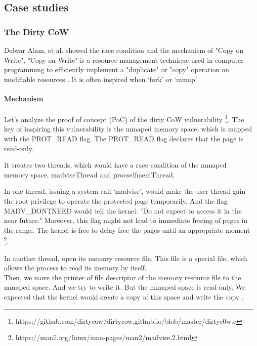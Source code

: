 \subsection{Case studies}
\label{k_case}

\subsubsection{The Dirty CoW}
Delwar Alam, et al. \cite{8019988} showed the race condition and the mechanism of "Copy on
Write". "Copy on Write" is a resource-management technique used in computer programming
to efficiently implement a "duplicate" or "copy" operation on modifiable resources \cite{6394426}.
It is often inspired when ‘fork' or ‘mmap'.

\paragraph{Mechanism}
Let's analyze the proof of concept (PoC) of the dirty CoW \cite{8019988} vulnerability
\footnote{https://github.com/dirtycow/dirtycow.github.io/blob/master/dirtyc0w.c}.
The key of inspiring this vulnerability is the mmaped memory space, which is mapped with
the PROT\_READ flag. The PROT\_READ flag declares that the page is read-only.


It creates two threads, which would have a race condition of the mmaped memory space,
madviseThread and procselfmemThread.



In one thread, issuing a system call `madvise', would make the user thread gain the root
privilege to operate the protected page temporarily. And the flag MADV\_DONTNEED would
tell the kernel: "Do not expect to access it in the near future." Moreover,
this flag might not lead to immediate freeing of pages in the range. The kernel is free
to delay free the pages until an appropriate moment \footnote{https://man7.org/linux/man-pages/man2/madvise.2.html}.



In another thread, open its memory resource file. This file is a special file, which allows
the process to read its memory by itself.\\

Then, we move the printer of file descriptor of the memory resource file to the mmaped
space. And we try to write it. But the mmaped space is read-only. We expected that the
kernel would create a copy of this space and write the copy \cite{8001953}.\\


